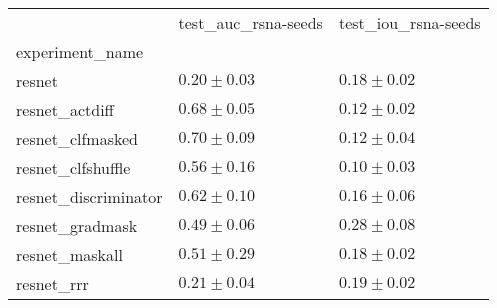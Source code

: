 \begin{tabular}{lll}
\toprule
{} & test_auc_rsna-seeds & test_iou_rsna-seeds \\
experiment_name      &                     &                     \\
\midrule
resnet               &       $0.20\pm0.03$ &       $0.18\pm0.02$ \\
resnet_actdiff       &       $0.68\pm0.05$ &       $0.12\pm0.02$ \\
resnet_clfmasked     &       $0.70\pm0.09$ &       $0.12\pm0.04$ \\
resnet_clfshuffle    &       $0.56\pm0.16$ &       $0.10\pm0.03$ \\
resnet_discriminator &       $0.62\pm0.10$ &       $0.16\pm0.06$ \\
resnet_gradmask      &       $0.49\pm0.06$ &       $0.28\pm0.08$ \\
resnet_maskall       &       $0.51\pm0.29$ &       $0.18\pm0.02$ \\
resnet_rrr           &       $0.21\pm0.04$ &       $0.19\pm0.02$ \\
\bottomrule
\end{tabular}
